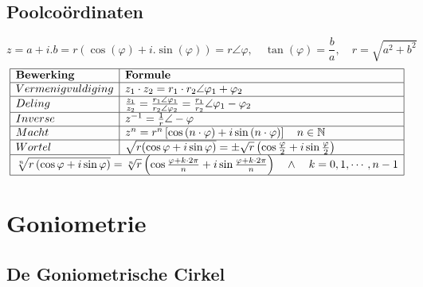 \documentclass[a5paper]{article}
\begin{document}
\subsection{Poolcoördinaten}
\[z = a + i.b = r\left( {\cos (\varphi ) + i.\sin (\varphi )} \right) = r\angle \varphi ,\quad \tan (\varphi ) = \frac{b}{a},\quad r = \sqrt {{a^2} + {b^2}} \]
\[
\begin{array}{|l|l|}
\hline
\textbf{Bewerking} & \textbf{Formule} \\
\hline
Vermenigvuldiging & {z_1} \cdot {z_2} = {r_1} \cdot {r_2}\angle {\varphi _1} + {\varphi _2} \\
\hline
Deling & \frac{{{z_1}}}{{{z_2}}} = \frac{{{r_1}\angle {\varphi _1}}}{{{r_2}\angle {\varphi _2}}} = \frac{{{r_1}}}{{{r_2}}}\angle {\varphi _1} - {\varphi _2} \\
\hline
Inverse & {z^{ - 1}} = \frac{1}{r}\angle  - \varphi  \\ \hline
Macht & {z^n} = {r^n}\left[ {\cos \left( {n \cdot \varphi } \right) + i\sin \left( {n \cdot \varphi } \right)} \right]\quad n \in {\displaystyle \mathbb {N} }\\
\hline
Wortel & 
\sqrt {r(\cos \varphi  + i\sin \varphi )}  =  \pm \sqrt r \left( {\cos \frac{\varphi }{2} + i\sin \frac{\varphi }{2}} \right)\\
\hline
\multicolumn{2}{|c|}{\sqrt[n]{{r\left( {\cos \varphi  + i\sin \varphi } \right)}} = \sqrt[n]{r}\left( {\cos \frac{{\varphi  + k \cdot 2\pi }}{n} + i\sin \frac{{\varphi  + k \cdot 2\pi }}{n}} \right)\quad  \wedge \quad k = 0,1, \cdots ,n - 1} \\
\hline
 \end{array}
\]

\newpage

\section{Goniometrie}
\subsection{De Goniometrische Cirkel}
\end{document}
